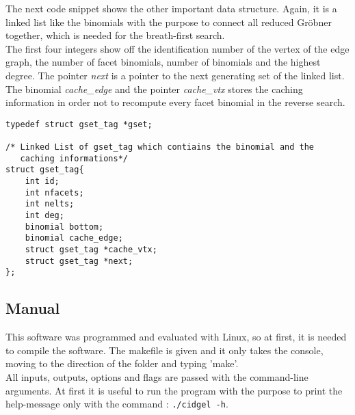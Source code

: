 The next code snippet shows the other important data structure. Again, it is a linked list like the binomials with the purpose to connect all reduced Gröbner together, which is needed for the breath-first search.\\

The first four integers show off the identification number of the vertex of the edge graph, the number of facet binomials, number of binomials and the highest degree. The pointer \emph{next} is a pointer to the next generating set of the linked list. The binomial \emph{cache\_edge} and the pointer \emph{cache\_vtx} stores the caching information in order not to recompute every facet binomial in the reverse search. 

\begin{lstlisting} 
typedef struct gset_tag *gset;

/* Linked List of gset_tag which contiains the binomial and the
   caching informations*/
struct gset_tag{
    int id;
    int nfacets;
    int nelts;
    int deg;
    binomial bottom;
    binomial cache_edge;
    struct gset_tag *cache_vtx;
    struct gset_tag *next;
};

\end{lstlisting}

 
 


\subsection{Manual}
\label{subsec:manual}
This software was programmed and evaluated with Linux, so at first, it is needed to compile the software. The makefile is given and it only takes the console, moving to the direction of the folder and typing 'make'. \\
All inputs, outputs, options and flags are passed with the command-line arguments. At first it is useful to run the program with the purpose to print the help-message only with the command : 
\texttt{./cidgel -h}.

